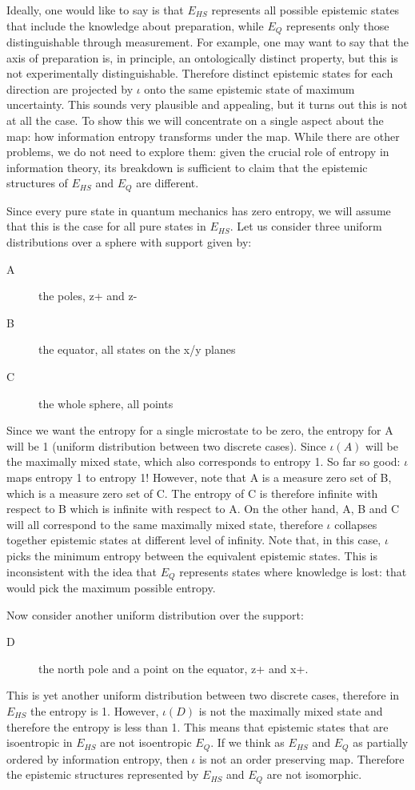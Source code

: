 \documentclass[10pt,twocolumn, nofootinbib]{revtex4-2}
\begin{document}
Ideally, one would like to say is that $E_{HS}$ represents all possible epistemic states that include the knowledge about preparation, while $E_{Q}$ represents only those distinguishable through measurement. For example, one may want to say that the axis of preparation is, in principle, an ontologically distinct property, but this is not experimentally distinguishable. Therefore distinct epistemic states for each direction are projected by $\iota$ onto the same epistemic state of maximum uncertainty. This sounds very plausible and appealing, but it turns out this is not at all the case. To show this we will concentrate on a single aspect about the map: how information entropy transforms under the map. While there are other problems, we do not need to explore them: given the crucial role of entropy in information theory, its breakdown is sufficient to claim that the epistemic structures of $E_{HS}$ and $E_{Q}$ are different.

Since every pure state in quantum mechanics has zero entropy, we will assume that this is the case for all pure states in $E_{HS}$. Let us consider three uniform distributions over a sphere with support given by:
\begin{description}
	\item[A] the poles, z+ and z-
	\item[B] the equator, all states on the x/y planes
	\item[C] the whole sphere, all points
\end{description}
Since we want the entropy for a single microstate to be zero, the entropy for A will be 1 (uniform distribution between two discrete cases). Since $\iota(A)$ will be the maximally mixed state, which also corresponds to entropy 1. So far so good: $\iota$ maps entropy 1 to entropy 1! However, note that A is a measure zero set of B, which is a measure zero set of C. The entropy of C is therefore infinite with respect to B which is infinite with respect to A. On the other hand, A, B and C will all correspond to the same maximally mixed state, therefore $\iota$ collapses together epistemic states at different level of infinity. Note that, in this case, $\iota$ picks the minimum entropy between the equivalent epistemic states. This is inconsistent with the idea that $E_{Q}$ represents states where knowledge is lost: that would pick the maximum possible entropy.

Now consider another uniform distribution over the support:
\begin{description}
	\item[D] the north pole and a point on the equator, z+ and x+.
\end{description}
This is yet another uniform distribution between two discrete cases, therefore in $E_{HS}$ the entropy is 1. However, $\iota(D)$ is not the maximally mixed state and therefore the entropy is less than 1. This means that epistemic states that are isoentropic in $E_{HS}$ are not isoentropic $E_{Q}$. If we think as $E_{HS}$ and $E_{Q}$ as partially ordered by information entropy, then $\iota$ is not an order preserving map. Therefore the epistemic structures represented by $E_{HS}$ and $E_{Q}$ are not isomorphic.
\end{document}
